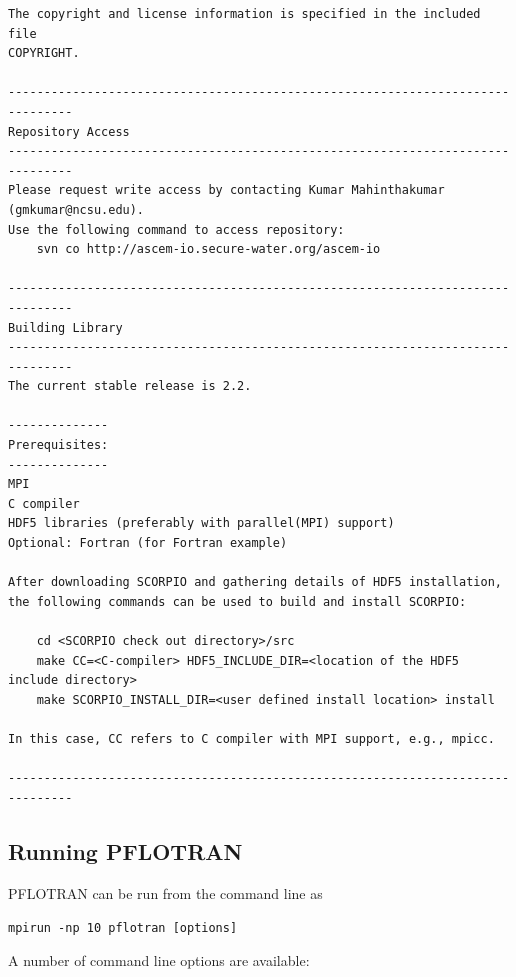 {\begin{verbatim}
The copyright and license information is specified in the included file 
COPYRIGHT. 

-------------------------------------------------------------------------------
Repository Access
-------------------------------------------------------------------------------
Please request write access by contacting Kumar Mahinthakumar (gmkumar@ncsu.edu). 
Use the following command to access repository:
	svn co http://ascem-io.secure-water.org/ascem-io

-------------------------------------------------------------------------------
Building Library
-------------------------------------------------------------------------------
The current stable release is 2.2.

--------------
Prerequisites:
--------------
MPI
C compiler
HDF5 libraries (preferably with parallel(MPI) support)
Optional: Fortran (for Fortran example)

After downloading SCORPIO and gathering details of HDF5 installation, 
the following commands can be used to build and install SCORPIO: 

	cd <SCORPIO check out directory>/src
	make CC=<C-compiler> HDF5_INCLUDE_DIR=<location of the HDF5 include directory>
	make SCORPIO_INSTALL_DIR=<user defined install location> install

In this case, CC refers to C compiler with MPI support, e.g., mpicc.

-------------------------------------------------------------------------------
\end{verbatim}

\normalsize

\newpage
\subsection{Running PFLOTRAN}

PFLOTRAN can be run from the command line as

\verb|mpirun -np 10 pflotran [options]|

A number of command line options are available:

}
